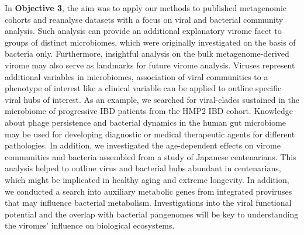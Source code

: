 \noindent
In \textbf{Objective 3}, the aim was to apply our methods to published metagenomic cohorts and reanalyse datasets with a focus on viral and bacterial community analysis. Such analysis can provide an additional explanatory virome facet to groups of distinct microbiomes, which were originally investigated on the basis of bacteria only. Furthermore, insightful analysis on the bulk metagenome-derived virome may also serve as landmarks for future virome analysis. Viruses represent additional variables in microbiomes, association of viral communities to a phenotype of interest like a clinical variable can be applied to outline specific viral hubs of interest. As an example, we searched for viral-clades sustained in the microbiome of progressive IBD patients from the HMP2 IBD cohort. Knowledge about phage persistence and bacterial dynamics in the human gut microbiome may be used for developing diagnostic or medical therapeutic agents for different pathologies. In addition, we investigated the age-dependent effects on virome communities and bacteria assembled from a study of Japanese centenarians. This analysis helped to outline virus and bacterial hubs abundant in centenarians, which might be implicated in healthy aging and extreme longevity. In addition, we conducted a search into auxiliary metabolic genes from integrated proviruses that may influence bacterial metabolism. Investigations into the viral functional potential and the overlap with bacterial pangenomes will be key to understanding the viromes’ influence on biological ecosystems.